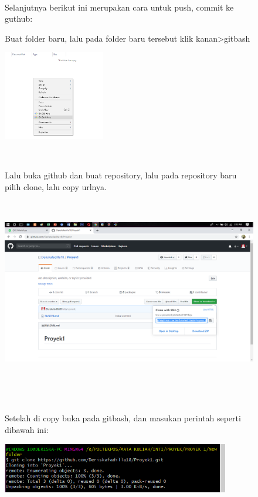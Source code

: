 \documentclass{book}
\begin{document}
\begin{enumerate}
\begin{figure} [ht]
\paragraph{}
Selanjutnya berikut ini merupakan cara untuk push, commit ke guthub:\\
    \item Buat folder baru, lalu pada folder baru tersebut klik kanan>gitbash\\
    \centerline{\includegraphics [width=4.45cm, height=5.79 cm]{figures/5.1.png}}\\
    \item Lalu buka github dan buat repository, lalu pada repository baru pilih clone, lalu copy urlnya.\\
    \centerline{\includegraphics [width=14.53cm, height=8.17cm]{figures/5.2.png}}\\
    \item Setelah di copy buka pada gitbash, dan masukan perintah seperti dibawah ini:\\
    \centerline{\includegraphics [width=7.09 cm, height=2.17cm]{figures/5.3.png}}\\

\end{figure}
\end{enumerate}
\end{document}
